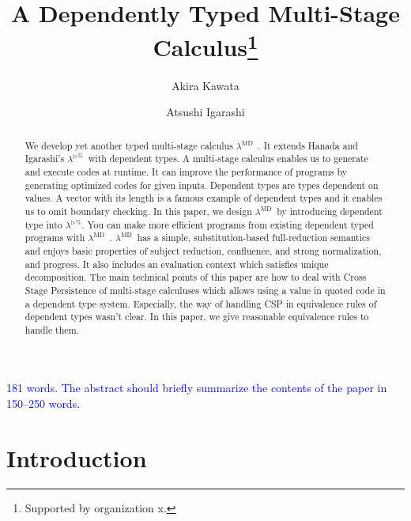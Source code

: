 \documentclass[runningheads]{llncs}
\newcommand{\blue}[1]{\textcolor{blue}{#1 }}
\newcommand{\LTP}{$\lambda^{\triangleright\%}$\ }
\newcommand{\LMD}{$\lambda^{\textrm{MD}}$\ }
\newcommand{\TW}{\triangleright}
\begin{document}
%
\title{A Dependently Typed Multi-Stage Calculus\thanks{Supported by organization x.}}
%
%
\author{Akira Kawata \and
    Atsushi Igarashi}
%
%
%
\maketitle              %
%
\begin{abstract}

    We develop yet another typed multi-stage calculus \LMD.
    It extends Hanada and Igarashi's \LTP with dependent types.
    A multi-stage calculus enables us to generate and execute codes at runtime.
    It can improve the performance of programs by generating optimized codes for given inputs.
    Dependent types are types dependent on values. 
    A vector with its length is a famous example of dependent types and it enables us to omit boundary checking.
    In this paper, we design \LMD by introducing dependent type into $\lambda^{\TW\%}$.
    You can make more efficient programs from existing dependent typed programs with \LMD.
    \LMD has a simple, substitution-based full-reduction semantics and enjoys basic properties of subject reduction, confluence, and strong normalization, and progress.
    It also includes an evaluation context which satisfies unique decomposition.
    The main technical points of this paper are how to deal with Cross Stage Persistence of multi-stage calculuses which allows using a value in quoted code in a dependent type system.
    Especially, the way of handling CSP in equivalence rules of dependent types wasn't clear.
    In this paper, we give reasonable equivalence rules to handle them.
    
\end{abstract}

\blue{181 words. The abstract should briefly summarize the contents of the paper in 150--250 words.}
%
%
%
\section{Introduction}
\end{document}
